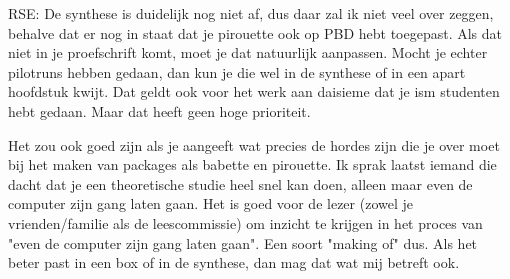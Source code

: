 

RSE: De synthese is duidelijk nog niet af, dus daar zal ik niet veel over zeggen, 
behalve dat er nog in staat dat je pirouette ook op PBD hebt toegepast. 
Als dat niet in je proefschrift komt, moet je dat natuurlijk aanpassen. 
Mocht je echter pilotruns hebben gedaan, 
dan kun je die wel in de synthese of in een apart hoofdstuk kwijt. 
Dat geldt ook voor het werk aan daisieme dat je ism studenten hebt gedaan. 
Maar dat heeft geen hoge prioriteit.

Het zou ook goed zijn als je aangeeft wat precies de hordes zijn die je over 
moet bij het maken van packages als babette en pirouette. 
Ik sprak laatst iemand die dacht dat je een theoretische studie heel snel kan doen, 
alleen maar even de computer zijn gang laten gaan. 
Het is goed voor de lezer (zowel je vrienden/familie als de leescommissie) 
om inzicht te krijgen in het proces van "even de computer zijn gang laten gaan". 
Een soort "making of" dus. Als het beter past in een box of in de synthese, 
dan mag dat wat mij betreft ook.

